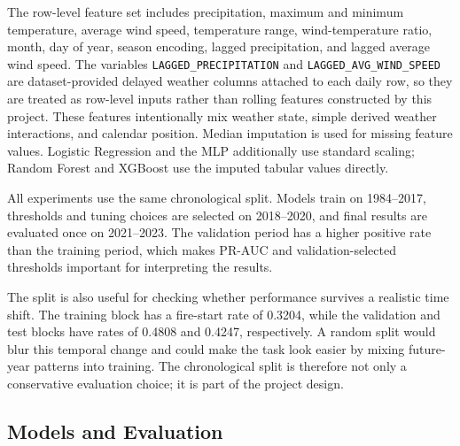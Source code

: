\documentclass{article}
\begin{document}
The row-level feature set includes precipitation, maximum
and minimum temperature, average wind speed, temperature
range, wind-temperature ratio, month, day of year, season
encoding, lagged precipitation, and lagged average wind
speed. The variables \texttt{LAGGED\_PRECIPITATION} and
\texttt{LAGGED\_AVG\_WIND\_SPEED} are dataset-provided delayed
weather columns attached to each daily row, so they are treated as
row-level inputs rather than rolling features constructed by this
project. These features intentionally mix weather state, simple
derived weather interactions, and calendar position. Median imputation
is used for missing feature values. Logistic Regression and the MLP
additionally use standard scaling; Random Forest and XGBoost use the
imputed tabular values directly.

All experiments use the same chronological split. Models train on 1984--2017, thresholds and tuning choices are selected on 2018--2020, and final results are evaluated once on 2021--2023. The validation period has a higher positive rate than the training period, which makes PR-AUC and validation-selected thresholds important for interpreting the results.

The split is also useful for checking whether performance survives a realistic time shift. The training block has a fire-start rate of 0.3204, while the validation and test blocks have rates of 0.4808 and 0.4247, respectively. A random split would blur this temporal change and could make the task look easier by mixing future-year patterns into training. The chronological split is therefore not only a conservative evaluation choice; it is part of the project design.

\subsection{Models and Evaluation}
\end{document}

